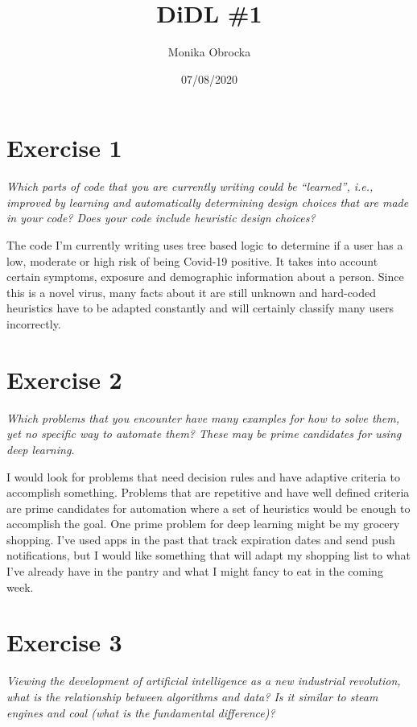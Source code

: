 \documentclass[a4paper]{article}
\title{DiDL \#1}
\author{Monika Obrocka}
\date{07/08/2020}
\begin{document}
\maketitle

\section{Exercise 1}

\emph{Which parts of code that you are currently writing could be “learned”, i.e., improved by learning and automatically determining design choices that are made in your code? Does your code include heuristic design choices?}

The code I'm currently writing uses tree based logic to determine if a user has a low, moderate or high risk of being Covid-19 positive. It takes into account certain symptoms, exposure and demographic information about a person. Since this is a novel virus, many facts about it are still unknown and hard-coded heuristics have to be adapted constantly and will certainly classify many users incorrectly. 

\section{Exercise 2}

\emph{Which problems that you encounter have many examples for how to solve them, yet no specific way to automate them? These may be prime candidates for using deep learning.}

I would look for problems that need decision rules and have adaptive criteria to accomplish something. Problems that are repetitive and have well defined criteria are prime candidates for automation where a set of heuristics would be enough to accomplish the goal. One prime problem for deep learning might be my grocery shopping. I've used apps in the past that track expiration dates and send push notifications, but I would like something that will adapt my shopping list to what I've already have in the pantry and what I might fancy to eat in the coming week.

\section{Exercise 3}

\emph{Viewing the development of artificial intelligence as a new industrial revolution, what is the relationship between algorithms and data? Is it similar to steam engines and coal (what is the fundamental difference)?}
\end{document}
